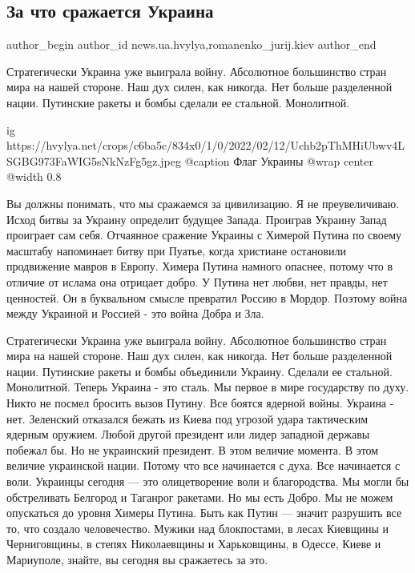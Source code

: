 
 
 
 
 
 
\subsection{За что сражается Украина}
\label{sec:04_03_2022.stz.news.ua.hvylya.1.za_chto_srazhaetsja_ukraina}
 
\ifcmt
 author_begin
   author_id news.ua.hvylya,romanenko_jurij.kiev
 author_end
\fi

\begin{zznagolos}
Стратегически Украина уже выиграла войну. Абсолютное большинство стран мира на
нашей стороне. Наш дух силен, как никогда. Нет больше разделенной нации.
Путинские ракеты и бомбы сделали ее стальной. Монолитной.	
\end{zznagolos}

\ifcmt
  ig https://hvylya.net/crops/c6ba5c/834x0/1/0/2022/02/12/Uchb2pThMHiUbwv4LSGBG973FaWIG5sNkNzFg5gz.jpeg
  @caption Флаг Украины
  @wrap center
  @width 0.8
\fi

Вы должны понимать, что мы сражаемся за цивилизацию. Я не преувеличиваю. Исход
битвы за Украину определит будущее Запада. Проиграв Украину Запад проиграет сам
себя. Отчаянное сражение Украины с Химерой Путина по своему масштабу напоминает
битву при Пуатье, когда христиане остановили продвижение мавров в Европу.
Химера Путина намного опаснее, потому что в отличие от ислама она отрицает
добро. У Путина нет любви, нет правды, нет ценностей. Он в буквальном смысле
превратил Россию в Мордор. Поэтому война между Украиной и Россией - это война
Добра и Зла.

Стратегически Украина уже выиграла войну. Абсолютное большинство стран мира на
нашей стороне. Наш дух силен, как никогда. Нет больше разделенной нации.
Путинские ракеты и бомбы объединили Украину. Сделали ее стальной. Монолитной.
Теперь Украина - это сталь. Мы первое в мире государству по духу. Никто не
посмел бросить вызов Путину. Все боятся ядерной войны. Украина - нет. Зеленский
отказался бежать из Киева под угрозой удара тактическим ядерным оружием. Любой
другой президент или лидер западной державы побежал бы. Но не украинский
президент. В этом величие момента. В этом величие украинской нации. Потому что
все начинается с духа. Все начинается с воли. Украинцы сегодня — это
олицетворение воли и благородства. Мы могли бы обстреливать Белгород и Таганрог
ракетами. Но мы есть Добро. Мы не можем опускаться до уровня Химеры Путина.
Быть как Путин — значит разрушить все то, что создало человечество. Мужики над
блокпостами, в лесах Киевщины и Черниговщины, в степях Николаевщины и
Харьковщины, в Одессе, Киеве и Мариуполе, знайте, вы сегодня вы сражаетесь за
это.

